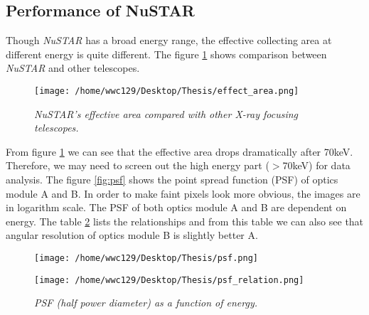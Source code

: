 \documentclass[12pt]{report}
\newcommand{\mycaption}[1]{\caption{\textit{\footnotesize #1}}}
\begin{document}
        \subsection{Performance of NuSTAR}
            Though \textit{NuSTAR} has a broad energy range, the effective collecting area at different energy is 
            quite different. The figure \ref{fig:effective_area} shows comparison between \textit{NuSTAR} and other 
            telescopes.
            \begin{figure}[h!]
              \centering
              \texttt{[image: /home/wwc129/Desktop/Thesis/effect\_area.png]}
              \mycaption{\textit{NuSTAR}'s effective area compared with other X-ray focusing telescopes.}
              \label{fig:effective_area}
            \end{figure}
            
            From figure \ref{fig:effective_area} we can see that the effective area drops dramatically after 70keV.
            Therefore, we may need to screen out the high energy part ($>$70keV) for data analysis.
            The figure \ref{fig:psf} shows the point spread function (PSF) of optics module A and B. In order to
            make faint pixels look more obvious, the images are in logarithm scale. The PSF of both optics module A
            and B are dependent on energy. The table \ref{table:psf_relation} lists the relationships and from this 
            table we can also see that angular resolution of optics module B is slightly better A.
            
             
            \begin{figure}[!htp]
              \centering
              \texttt{[image: /home/wwc129/Desktop/Thesis/psf.png]}
              \mycaption{Image of NuSTAR's point spread function of optics module A(left) and B(right).}
              \label{fig:psf}
              \vspace{1.5cm} 
              \texttt{[image: /home/wwc129/Desktop/Thesis/psf\_relation.png]}
              \mycaption{PSF (half power diameter) as a function of energy.}
              \label{table:psf_relation}
            \end{figure}
\end{document}
